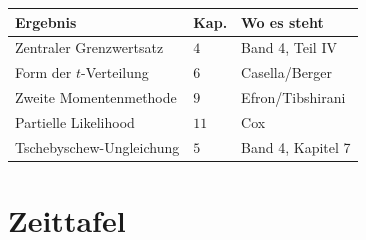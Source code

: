 \begin{merksatz}
\begin{center}
{\small
\renewcommand{\arraystretch}{1.5}
\begin{tabular}{@{}P{3.4cm}P{1.4cm}P{3.4cm}@{}}
\toprule
\textbf{Ergebnis} & \textbf{Kap.} & \textbf{Wo es steht}\\
\midrule
Zentraler Grenzwertsatz & $4$ & Band 4, Teil IV\\
Form der $t$-Verteilung & $6$ & Casella/Berger\\
Zweite Momentenmethode & $9$ & Efron/Tibshirani\\
Partielle Likelihood & $11$ & Cox\\
Tschebyschew-Ungleichung & $5$ & Band 4, Kapitel 7\\
\bottomrule
\end{tabular}}
\end{center}

\begin{center}
\begin{minipage}{0.88\textwidth}
\end{minipage}
\end{center}
\end{merksatz}

\section{Zeittafel}

